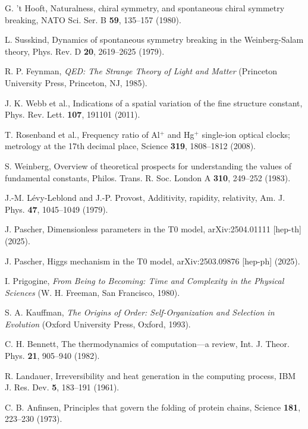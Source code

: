 \documentclass[twocolumn,aps,prl]{revtex4-2}
\begin{document}
\begin{thebibliography}{99}
		 G. 't Hooft, Naturalness, chiral symmetry, and spontaneous chiral symmetry breaking, NATO Sci. Ser. B \textbf{59}, 135--157 (1980).
		
		 L. Susskind, Dynamics of spontaneous symmetry breaking in the Weinberg-Salam theory, Phys. Rev. D \textbf{20}, 2619--2625 (1979).
		
		 R. P. Feynman, \textit{QED: The Strange Theory of Light and Matter} (Princeton University Press, Princeton, NJ, 1985).
		
		 J. K. Webb et al., Indications of a spatial variation of the fine structure constant, Phys. Rev. Lett. \textbf{107}, 191101 (2011).
		
		 T. Rosenband et al., Frequency ratio of Al$^+$ and Hg$^+$ single-ion optical clocks; metrology at the 17th decimal place, Science \textbf{319}, 1808--1812 (2008).
		
		 S. Weinberg, Overview of theoretical prospects for understanding the values of fundamental constants, Philos. Trans. R. Soc. London A \textbf{310}, 249--252 (1983).
		
		 J.-M. Lévy-Leblond and J.-P. Provost, Additivity, rapidity, relativity, Am. J. Phys. \textbf{47}, 1045--1049 (1979).
		
		 J. Pascher, Dimensionless parameters in the T0 model, arXiv:2504.01111 [hep-th] (2025).
		
		 J. Pascher, Higgs mechanism in the T0 model, arXiv:2503.09876 [hep-ph] (2025).
		
		 I. Prigogine, \textit{From Being to Becoming: Time and Complexity in the Physical Sciences} (W. H. Freeman, San Francisco, 1980).
		
		 S. A. Kauffman, \textit{The Origins of Order: Self-Organization and Selection in Evolution} (Oxford University Press, Oxford, 1993).
		
		 C. H. Bennett, The thermodynamics of computation---a review, Int. J. Theor. Phys. \textbf{21}, 905--940 (1982).
		
		 R. Landauer, Irreversibility and heat generation in the computing process, IBM J. Res. Dev. \textbf{5}, 183--191 (1961).
		
		 C. B. Anfinsen, Principles that govern the folding of protein chains, Science \textbf{181}, 223--230 (1973).
		

\end{thebibliography}
\end{document}
